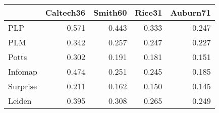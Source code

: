 \begin{tabular}{lrrrr}
\toprule
{} & Caltech36 & Smith60 & Rice31 & Auburn71 \\
\midrule
PLP      &     0.571 &   0.443 &  0.333 &    0.247 \\
PLM      &     0.342 &   0.257 &  0.247 &    0.227 \\
Potts    &     0.302 &   0.191 &  0.181 &    0.151 \\
Infomap  &     0.474 &   0.251 &  0.245 &    0.185 \\
Surprise &     0.211 &   0.162 &  0.150 &    0.145 \\
Leiden   &     0.395 &   0.308 &  0.265 &    0.249 \\
\bottomrule
\end{tabular}
